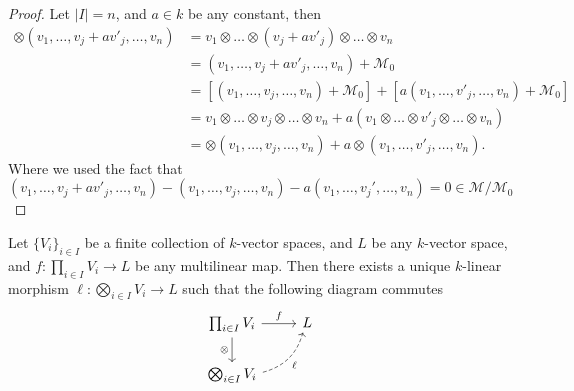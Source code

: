 \begin{proof}
    Let \(|I| = n\), and \(a \in k\) be any constant, then
    \begin{align*}
        \otimes(v_1, \dots, v_j + a v'_j, \dots, v_n)
         & = v_1 \otimes \dots \otimes (v_j + a v'_j) \otimes \dots \otimes v_n
        \\
         & = (v_1, \dots, v_j + a v'_j, \dots, v_n) + \mathcal M_0
        \\
         & = [(v_1, \dots, v_j, \dots, v_n) + \mathcal M_0]
        + [a (v_1, \dots, v'_j, \dots, v_n) + \mathcal M_0]
        \\
         & = v_1 \otimes \dots \otimes v_j \otimes \dots \otimes v_n
        + a(v_1 \otimes \dots \otimes v'_j \otimes \dots \otimes v_n)
        \\
         & = \otimes(v_1, \dots, v_j, \dots, v_n) + a \otimes(v_1, \dots, v'_j, \dots, v_n).
    \end{align*}
    Where we used the fact that
    \[
        (v_1, \dots, v_j + a v'_j, \dots, v_n) - (v_1, \dots, v_j, \dots, v_n)
        - a (v_1, \dots, v_j', \dots, v_n) = 0 \in \mathcal M / \mathcal M_{0}
    \]
\end{proof}

\begin{theorem}
    \label{thm: universal property of tensor products}
    Let \(\{V_i\}_{i \in I}\) be a finite collection of \(k\)-vector spaces, and
    \(L\) be any \(k\)-vector space, and \(f: \prod_{i \in I} V_i \to L\) be any
    multilinear map. Then there exists a unique \(k\)-linear morphism \(\ell :
    \bigotimes_{i \in I} V_i \to L\) such that the following diagram commutes
    \[
        \begin{tikzcd}
            \prod_{i \in I} V_i
            \ar[r, "f"]
            \ar[d, swap, "\otimes"]
            &L \\
            \bigotimes_{i \in I} V_i
            \ar[ur, swap, bend right, dashed, "\ell"]
        \end{tikzcd}
    \]
\end{theorem}

